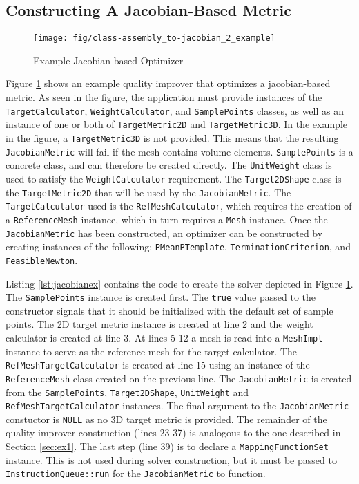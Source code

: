 \documentclass{article}
\begin{document}
\subsection{Constructing A Jacobian-Based Metric}


\begin{figure}[p]
\begin{center}
\texttt{[image: fig/class-assembly\_to-jacobian\_2\_example]}
\caption{Example Jacobian-based Optimizer\label{fig:jacobianex}}
\end{center}
\end{figure}

Figure \ref{fig:jacobianex} shows an example quality improver that optimizes a jacobian-based metric.  As seen in the figure, the application must provide instances of the \texttt{TargetCalculator}, \texttt{WeightCalculator}, and \texttt{SamplePoints} classes, as well as an instance of one or both of \texttt{TargetMetric2D} and \texttt{TargetMetric3D}.  In the example in the figure, a \texttt{TargetMetric3D} is not provided.  This means that the resulting \texttt{JacobianMetric} will fail if the mesh contains volume elements.  \texttt{SamplePoints} is a concrete class, and can therefore be created directly.  The \texttt{UnitWeight} class is used to satisfy the \texttt{WeightCalculator} requirement.  The \texttt{Target2DShape} class is the \texttt{TargetMetric2D} that will be used by the \texttt{JacobianMetric}.  The \texttt{TargetCalculator} used is the \texttt{RefMeshCalculator}, which requires the creation of a \texttt{ReferenceMesh} instance, which in turn requires a \texttt{Mesh} instance.  Once the \texttt{JacobianMetric} has been constructed, an optimizer can be constructed by creating instances of the following: \texttt{PMeanPTemplate}, \texttt{TerminationCriterion}, and \texttt{FeasibleNewton}.

Listing \ref{lst:jacobianex} contains the code to create the solver depicted in Figure \ref{fig:jacobianex}.  The \texttt{SamplePoints} instance is created first.  The \texttt{true} value passed to the constructor signals that it should be initialized with the default set of sample points.  The 2D target metric instance is created at line 2 and the weight calculator is created at line 3.  At lines 5-12 a mesh is read into a \texttt{MeshImpl} instance to serve as the reference mesh for the target calculator.  The \texttt{RefMeshTargetCalculator} is created at line 15 using an instance of the \texttt{ReferenceMesh} class created on the previous line.  The \texttt{JacobianMetric} is created from the \texttt{SamplePoints}, \texttt{Target2DShape}, \texttt{UnitWeight} and \texttt{RefMeshTargetCalculator} instances.  The final argument to the \texttt{JacobianMetric} constuctor is \texttt{NULL} as no 3D target metric is provided.  The remainder of the quality improver construction (lines 23-37) is analogous to the one described in Section \ref{sec:ex1}.  The last step (line 39) is to declare a \texttt{MappingFunctionSet} instance.  This is not used during solver construction, but it must be passed to \texttt{InstructionQueue::run} for the \texttt{JacobianMetric} to function.
\end{document}
